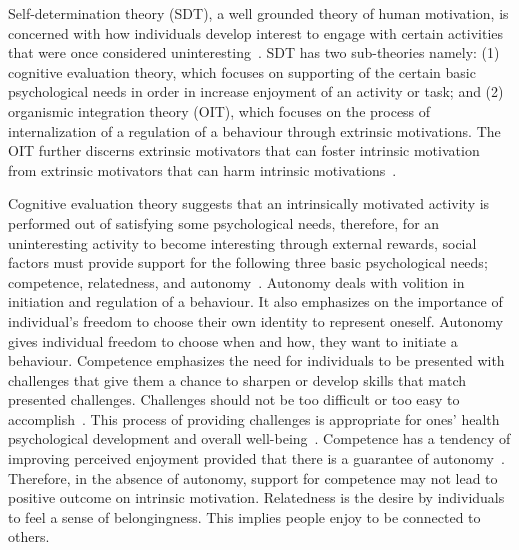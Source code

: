 Self-determination theory (SDT)\citep{deci1985:intrinsic}, a well grounded theory of human motivation, is concerned with how individuals develop interest to engage with certain activities that were once considered uninteresting~\citep{ryan2000intrinsic}. SDT has two sub-theories namely: (1) cognitive evaluation theory, which focuses on supporting of the certain basic psychological needs in order in increase enjoyment of an activity or task; and (2) organismic integration theory (OIT), which focuses on the process of internalization of a regulation of a behaviour through extrinsic motivations. The OIT further discerns extrinsic motivators that can foster intrinsic motivation from extrinsic motivators that can harm intrinsic motivations~\citep{ryan2000:self,lee2015:relating}.

Cognitive evaluation theory suggests that an intrinsically motivated activity is performed out of satisfying some psychological needs, therefore, for an uninteresting activity to become interesting through external rewards, social factors must provide support for the following three basic psychological needs; competence, relatedness, and autonomy~\citep{ryan2000intrinsic}. Autonomy deals with volition in initiation and regulation of a behaviour. It also emphasizes on the importance of individual's freedom to choose their own identity to represent oneself.  Autonomy gives individual freedom to choose when and how, they want to initiate a behaviour. Competence emphasizes the need for individuals to be presented with challenges that give them a chance to sharpen or develop skills that match presented challenges. Challenges should not be too difficult or too easy to accomplish~\citep{zhang2008motivational,colineau2011motivating}. This process of providing challenges is appropriate for ones' health psychological development and  overall well-being~\citep{zhang2008motivational}. Competence has a tendency of improving perceived enjoyment provided that there is a guarantee of autonomy~\citep{forde2015informational}. Therefore, in the absence of autonomy, support for competence may not lead to positive outcome on intrinsic motivation. Relatedness is the desire by individuals to feel a sense of belongingness. This implies people enjoy to be connected to others.

